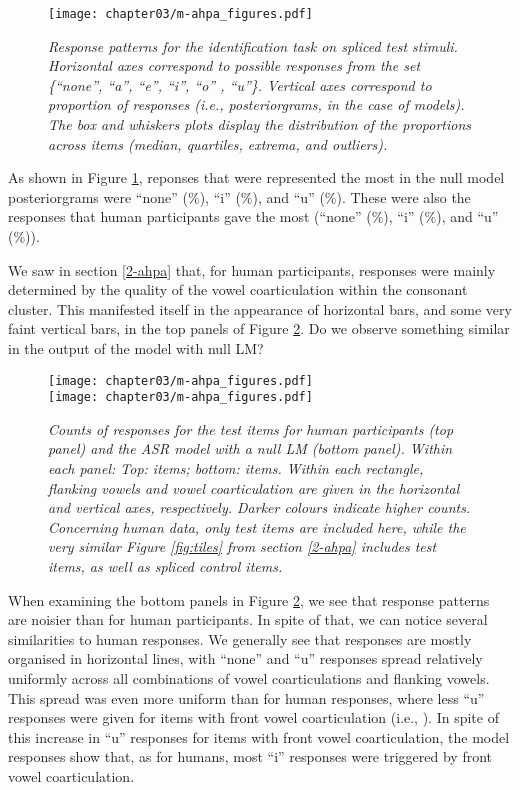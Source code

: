 {\begin{figure}[htb!]
\centering
\texttt{[image: chapter03/m-ahpa\_figures.pdf]}
\caption{\textit{Response patterns for the identification task on spliced test stimuli. Horizontal axes correspond to possible responses from the set \{``none'', ``a'', ``e'', ``i'', ``o'' , ``u''\}. Vertical axes correspond to proportion of responses (i.e., posteriorgrams, in the case of models). The box and whiskers plots display the distribution of the proportions across items (median, quartiles, extrema, and outliers).}}
\label{fig:m-ahpa_test_coll}
\end{figure}

As shown in Figure \ref{fig:m-ahpa_test_coll}, reponses that were represented the most in the null model posteriorgrams were {\color{red}``none'' (\%), ``i'' (\%), and ``u'' (\%)}. These were also the responses that human participants gave the most {\color{red}(``none'' (\%), ``i'' (\%), and ``u'' (\%))}.

We saw in section \ref{2-ahpa} that, for human participants, responses were mainly determined by the quality of the vowel coarticulation within the consonant cluster. This manifested itself in the appearance of horizontal bars, and some very faint vertical bars, in the top panels of Figure \ref{fig:m-ahpa_test_heat}. Do we observe something similar in the output of the model with null LM?

\begin{figure}[htb!]
\centering
\texttt{[image: chapter03/m-ahpa\_figures.pdf]} \\ \vspace{0.5cm}
\texttt{[image: chapter03/m-ahpa\_figures.pdf]}
\caption{\textit{Counts of responses for the test items for human participants (top panel) and the ASR model with a null LM (bottom panel). Within each panel: Top: items; bottom: items. Within each rectangle, flanking vowels and vowel coarticulation are given in the horizontal and vertical axes, respectively. Darker colours indicate higher counts. Concerning human data, only test items are included here, while the very similar Figure \ref{fig:tiles} from section \ref{2-ahpa} includes test items, as well as spliced control items.}}
\label{fig:m-ahpa_test_heat}
\end{figure}

When examining the bottom panels in Figure \ref{fig:m-ahpa_test_heat}, we see that response patterns are noisier than for human participants. In spite of that, we can notice several similarities to human responses.
We generally see that responses are mostly organised in horizontal lines, with ``none'' and ``u'' responses spread relatively uniformly across all combinations of vowel coarticulations and flanking vowels. This spread was even more uniform than for human responses, where less ``u'' responses were given for items with front vowel coarticulation (i.e., \textipa{[i, e]}). In spite of this increase in ``u'' responses for items with front vowel coarticulation, the model responses show that, as for humans, most ``i'' responses were triggered by front vowel coarticulation.

}
